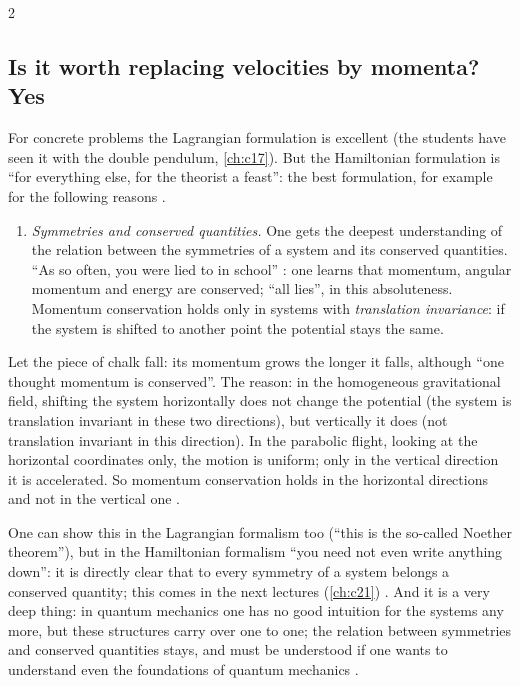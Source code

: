 \begin{paracol}{2}
\subsection{Is it worth replacing velocities by momenta? Yes}\label{ssec:lt-worth}

For concrete problems the Lagrangian formulation is excellent (the students have seen it with the double pendulum, \cref{ch:c17}). But the Hamiltonian formulation is ``for everything else, for the theorist a feast'': the best formulation, for example for the following reasons .

\begin{enumerate}
  \item \emph{Symmetries and conserved quantities.} One gets the deepest understanding of the relation between the symmetries of a system and its conserved quantities. ``As so often, you were lied to in school'' : one learns that momentum, angular momentum and energy are conserved; ``all lies'', in this absoluteness. Momentum conservation holds only in systems with \emph{translation invariance}: if the system is shifted to another point the potential stays the same.
\end{enumerate}

\begin{example}\label{ex:lt-chalk}
Let the piece of chalk fall: its momentum grows the longer it falls, although ``one thought momentum is conserved''. The reason: in the homogeneous gravitational field, shifting the system horizontally does not change the potential (the system is translation invariant in these two directions), but vertically it does (not translation invariant in this direction). In the parabolic flight, looking at the horizontal coordinates only, the motion is uniform; only in the vertical direction it is accelerated. So momentum conservation holds in the horizontal directions and not in the vertical one .
\end{example}
One can show this in the Lagrangian formalism too (``this is the so-called Noether theorem''), but in the Hamiltonian formalism ``you need not even write anything down'': it is directly clear that to every symmetry of a system belongs a conserved quantity; this comes in the next lectures (\cref{ch:c21}) . And it is a very deep thing: in quantum mechanics one has no good intuition for the systems any more, but these structures carry over one to one; the relation between symmetries and conserved quantities stays, and must be understood if one wants to understand even the foundations of quantum mechanics .


\end{paracol}
